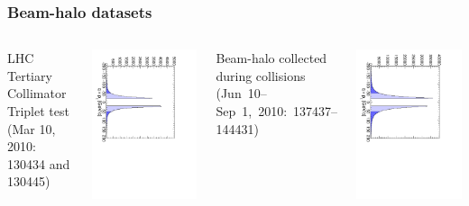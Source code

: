 \documentclass[compress]{beamer}
\begin{document}
\begin{frame}
\frametitle{Beam-halo datasets}

\begin{columns}
\centering LHC Tertiary Collimator Triplet test (Mar 10, 2010: 130434
and 130445)

\includegraphics[height=\linewidth, angle=90]{qpz_spectrum_TST.pdf}

\centering Beam-halo collected during collisions \mbox{(Jun 10--Sep 1, 2010: 137437--144431)\hspace{-0.1 cm}}

\includegraphics[height=\linewidth, angle=90]{qpz_spectrum.pdf}
\end{columns}


\end{frame}
\end{document}
